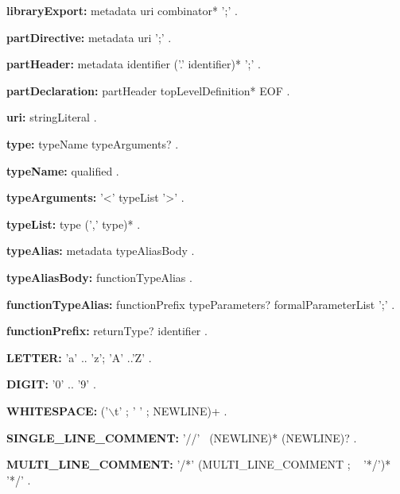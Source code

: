 \begin{grammar}
{\bf libraryExport:}
    metadata \EXPORT{}  uri  combinator* ';'
    .
\end{grammar}
\begin{grammar}
{\bf partDirective:}
    metadata \PART{}   uri ';' 
    .

{\bf partHeader:}
    metadata \PART{} \OF{} identifier ('.' identifier)* ';'
    .

{\bf partDeclaration:}
    partHeader topLevelDefinition* EOF
    .
\end{grammar}
\begin{grammar}
{\bf uri:}
    stringLiteral
    .
\end{grammar}
\begin{grammar}
{\bf type:}
    typeName typeArguments?
    .

{\bf typeName:}
    qualified 
    .

{\bf typeArguments:}
    '<' typeList '>'
    .

{\bf typeList:}
    type (',' type)*
    .
 \end{grammar}
\begin{grammar}

{\bf typeAlias:}
    metadata  \TYPEDEF{} typeAliasBody
    .
  
{\bf typeAliasBody:}
    functionTypeAlias
    .

{\bf functionTypeAlias:}
    functionPrefix  typeParameters? formalParameterList ';'
    .
    
{\bf functionPrefix:}
    returnType? identifier
    .    
\end{grammar}
\begin{grammar}
{\bf LETTER:}
    'a' .. 'z';
    'A' ..'Z'
    .

{\bf DIGIT:}
    '0' .. '9'
    .

{\bf WHITESPACE:}
    ('$\backslash$t' ; ' ' ; NEWLINE)+
    .
\end{grammar}
\begin{grammar}
{\bf SINGLE_LINE_COMMENT:}
    '//' ~(NEWLINE)* (NEWLINE)?
    .

{\bf MULTI_LINE_COMMENT:}
    '/*' (MULTI_LINE_COMMENT ; ~ '*/')* '*/'
    .
\end{grammar}